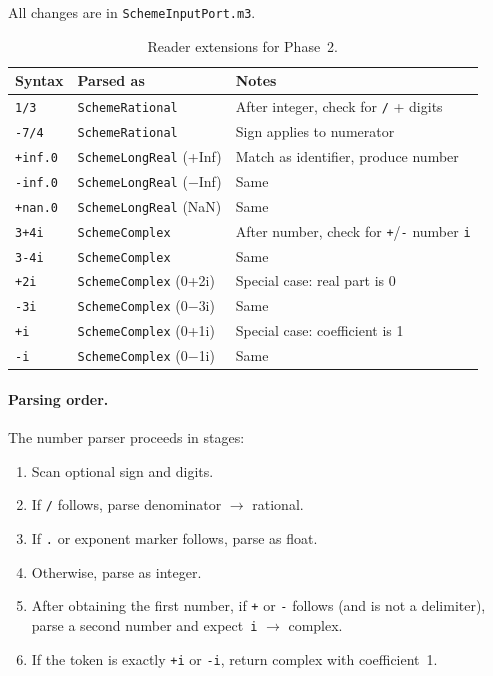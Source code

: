\documentclass[12pt]{article}
\begin{document}
All changes are in {\tt SchemeInputPort.m3}.

\begin{table}[htbp]
\centering
\begin{tabular}{lll}
\toprule
\textbf{Syntax} & \textbf{Parsed as} & \textbf{Notes} \\
\midrule
{\tt 1/3} & {\tt SchemeRational} & After integer, check for {\tt /} + digits \\
{\tt -7/4} & {\tt SchemeRational} & Sign applies to numerator \\
{\tt +inf.0} & {\tt SchemeLongReal} (+Inf) & Match as identifier, produce number \\
{\tt -inf.0} & {\tt SchemeLongReal} ($-$Inf) & Same \\
{\tt +nan.0} & {\tt SchemeLongReal} (NaN) & Same \\
{\tt 3+4i} & {\tt SchemeComplex} & After number, check for {\tt +}/{\tt -} number {\tt i} \\
{\tt 3-4i} & {\tt SchemeComplex} & Same \\
{\tt +2i} & {\tt SchemeComplex} (0+2i) & Special case: real part is 0 \\
{\tt -3i} & {\tt SchemeComplex} (0$-$3i) & Same \\
{\tt +i} & {\tt SchemeComplex} (0+1i) & Special case: coefficient is 1 \\
{\tt -i} & {\tt SchemeComplex} (0$-$1i) & Same \\
\bottomrule
\end{tabular}
\caption{Reader extensions for Phase~2.}
\label{tab:reader}
\end{table}

\paragraph{Parsing order.}
The number parser proceeds in stages:
\begin{enumerate}[nosep]
\item Scan optional sign and digits.
\item If {\tt /} follows, parse denominator $\to$ rational.
\item If {\tt .} or exponent marker follows, parse as float.
\item Otherwise, parse as integer.
\item After obtaining the first number, if {\tt +} or {\tt -}
  follows (and is not a delimiter), parse a second number and
  expect~{\tt i} $\to$ complex.
\item If the token is exactly {\tt +i} or {\tt -i}, return
  complex with coefficient~1.
\end{enumerate}
\end{document}
